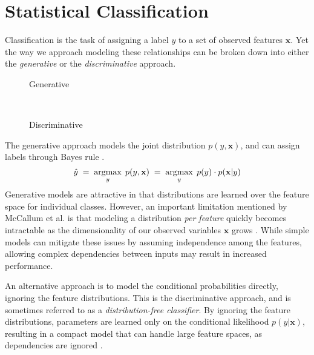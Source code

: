 \documentclass{article}
\DeclareMathOperator*{\argmax}{argmax}
\begin{document}

\section{Statistical Classification}
\label{sec:classification}
Classification is the task of assigning a label $y$ to a set of observed
features $\mathbf{x}$. Yet the way we approach modeling these relationships
can be broken down into either the \textit{generative} or the
\textit{discriminative} approach.

\begin{figure*}[h!]
    \centering
    \begin{subfigure}[t]{0.15\textwidth}
        \centering
        \caption*{Generative}
    \end{subfigure}%
    ~
    \begin{subfigure}[t]{0.15\textwidth}
        \centering
        \caption*{Discriminative}
    \end{subfigure}
\end{figure*}

The generative approach models the joint distribution $p(y, \mathbf{x})$,
and can assign labels through Bayes rule \cite{NgJordan}.
\begin{equation}
    \hat{y} \; = \; \argmax_y \; p(y, \mathbf{x}) \; = \; \argmax_y \; p(y) \cdot p(\mathbf{x} | y) \\
\end{equation}
Generative models are attractive in that distributions are learned over the
feature space for individual classes. However, an important limitation
mentioned by McCallum et al. is that modeling a distribution
\textit{per feature} quickly becomes intractable as the dimensionality of our
observed variables $\mathbf{x}$ grows \cite{McCallumCRF}. While simple models
can mitigate these issues by assuming independence among the features,
allowing complex dependencies between inputs may result in
increased performance.

An alternative approach is to model the conditional probabilities directly,
ignoring the feature distributions. This is the discriminative approach,
and is sometimes referred to as a \textit{distribution-free classifier}.
By ignoring the feature distributions, parameters are learned only on the
conditional likelihood $p(y | \mathbf{x})$, resulting in a compact model
that can handle large feature spaces, as dependencies
are ignored \cite{McCallumCRF}.
\end{document}
